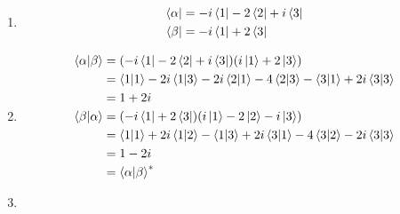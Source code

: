 \documentclass{article}
\begin{document}
\begin{enumerate}
  \item

        \begin{align*}
          \bra{\alpha} & = -i \bra{1} - 2 \bra{2} + i \bra{3} \\
          \bra{\beta}  & = -i \bra{1} + 2 \bra{3}
        \end{align*}

  \item

        \begin{align*}
          \braket{\alpha | \beta} & = (-i \bra{1} - 2 \bra{2} + i \bra{3}) (i \ket{1} + 2 \ket{3})                                                      \\
                                  & = \braket{1 | 1} - 2 i \braket{1 | 3} - 2 i \braket{2 | 1} - 4 \braket{2 | 3} - \braket{3 | 1} + 2 i \braket{3 | 3} \\
                                  & = 1 + 2 i                                                                                                           \\
          \braket{\beta | \alpha} & = (-i \bra{1} + 2 \bra{3}) (i \ket{1} - 2 \ket{2} - i \ket{3})                                                      \\
                                  & = \braket{1 | 1} + 2 i \braket{1 | 2} - \braket{1 | 3} + 2 i \braket{3 | 1} - 4 \braket{3 | 2} - 2 i \braket{3 | 3} \\
                                  & = 1 - 2 i                                                                                                           \\
                                  & = \braket{\alpha | \beta}^*
        \end{align*}

  \item


\end{enumerate}
\end{document}
